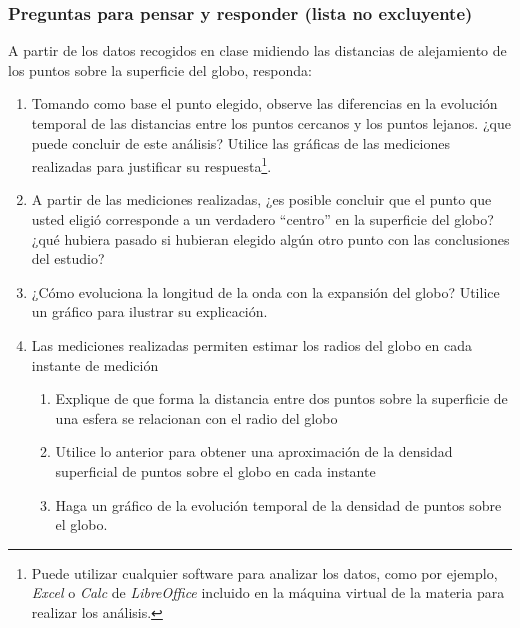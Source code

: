 \documentclass[a4paper,11pt]{article}
\begin{document}
\subsubsection*{Preguntas para pensar y responder (lista no excluyente)}

A partir de los datos recogidos en clase midiendo las distancias de alejamiento de los puntos sobre la superficie del globo, responda:

\begin{enumerate}
  \item Tomando como base el punto elegido, observe las diferencias en la evolución temporal de las distancias entre los puntos cercanos y los puntos lejanos. ¿que puede concluir de este análisis? Utilice las gráficas de las mediciones realizadas para justificar su respuesta\footnote{Puede utilizar cualquier software para analizar los datos, como por ejemplo, {\emph{Excel}} o {\emph{Calc}} de {\emph{LibreOffice}} incluido en la máquina virtual de la materia para realizar los análisis.}.
  \item A partir de las mediciones realizadas, ¿es posible concluir que el punto que usted eligió corresponde a un verdadero ``centro'' en la superficie del globo? ¿qué hubiera pasado si hubieran elegido algún otro punto con las conclusiones del estudio?
  \item ¿Cómo evoluciona la longitud de la onda con la expansión del globo? Utilice un gráfico para ilustrar su explicación.
  \item Las mediciones realizadas permiten estimar los radios del globo en cada instante de medición
    \begin{enumerate}
      \item Explique de que forma la distancia entre dos puntos sobre la superficie de una esfera se relacionan con el radio del globo
      \item Utilice lo anterior para obtener una aproximación de la densidad superficial de puntos sobre el globo en cada instante
      \item Haga un gráfico de la evolución temporal de la densidad de puntos sobre el globo.
    \end{enumerate}
\end{enumerate}
\end{document}
